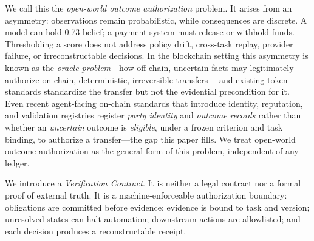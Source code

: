 \documentclass[sigconf,anonymous,review]{acmart}
\begin{document}
We call this the \emph{open-world outcome authorization} problem. It arises from an asymmetry: observations remain probabilistic, while consequences are discrete. A model can hold 0.73 belief; a payment system must release or withhold funds. Thresholding a score does not address policy drift, cross-task replay, provider failure, or irreconstructable decisions. In the blockchain setting this asymmetry is known as the \emph{oracle problem}---how off-chain, uncertain facts may legitimately authorize on-chain, deterministic, irreversible transfers \cite{caldarelli2020oracle,zhang2016towncrier,breidenbach2021chainlink}---and existing token standards \cite{vogelsteller2015erc20} standardize the transfer but not the evidential precondition for it. Even recent agent-facing on-chain standards that introduce identity, reputation, and validation registries \cite{ethereum2025erc8004} register \emph{party identity} and \emph{outcome records} rather than whether an \emph{uncertain} outcome is \emph{eligible}, under a frozen criterion and task binding, to authorize a transfer---the gap this paper fills. We treat open-world outcome authorization as the general form of this problem, independent of any ledger.

We introduce a \emph{Verification Contract}. It is neither a legal contract nor a formal proof of external truth. It is a machine-enforceable authorization boundary: obligations are committed before evidence; evidence is bound to task and version; unresolved states can halt automation; downstream actions are allowlisted; and each decision produces a reconstructable receipt.
\end{document}
